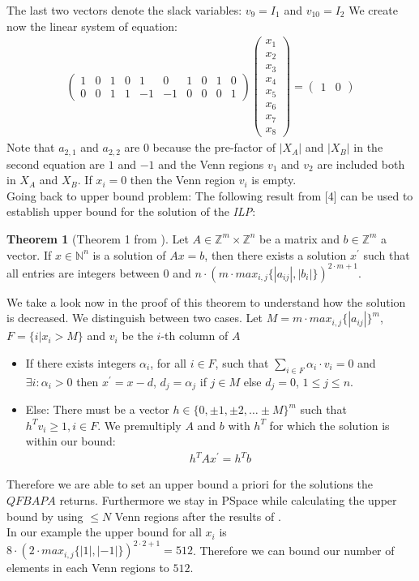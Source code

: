 \documentclass{book}
\theoremstyle{break}
\theoremstyle{definition}
\newtheorem{mythe}{Theorem}
\begin{document}
The last two vectors denote the slack variables: $v_9=I_1$ and $v_10=I_2$
We create now the linear system of equation:
\begin{align*}
\left ( \begin{array}{cccccccccc}
1&0&1&0&1&0&1&0&1&0\\
0&0&1&1&-1&-1&0&0&0&1
\end{array} \right )\left ( \begin{array}{c}
x_1\\x_2\\x_3\\x_4\\x_5\\x_6\\x_7\\x_8
\end{array}\right )=\left ( \begin{array}{cc}
1&0
\end{array}\right )
\end{align*}
Note that $a_{2,1}$ and $a_{2,2}$ are $0$ because the pre-factor of $|X_A|$ and $|X_B|$ in the second equation are $1$ and $-1$ and the Venn regions $v_1$ and $v_2$ are included both in $X_A$ and $X_B$. If $x_i=0$ then the Venn region $v_i$ is empty.\\
Going back to upper bound problem: The following result from [4] can be used to establish upper bound for the solution of the \textit{ILP}:
\begin{mythe}[Theorem 1 from \cite{knapsack}]\label{upper bound}
Let $A\in \mathbb{Z}^m\times \mathbb{Z}^n$ be a matrix and $b\in\mathbb{Z}^m$ a vector. If $x\in\mathbb{N}^n$ is a solution of $Ax=b$, then there exists a solution $x^\prime$ such that all entries are integers between $0$ and $n\cdot (m\cdot max_{i,j}\{|a_{ij}|,|b_i|\})^{2\cdot m+1}$.
\end{mythe}
We take a look now in the proof of this theorem to understand how the solution is decreased. We distinguish between two cases. Let $M=m\cdot max_{i,j}\{|a_{ij}|\}^m$, $F=\{i|x_i>M\}$ and $v_i$ be the $i$-th column of $A$
\begin{itemize}
\item If there exists integers $\alpha_i$, for all $i\in F$, such that $\sum_{i\in F}\alpha_i\cdot v_i=0$ and $\exists i: \alpha_i>0$ then $x^\prime=x-d$, $d_j=\alpha_j$ if $j\in M$ else $d_j=0$, $1\leq j\leq n$.
\item Else: There must be a vector $h\in\{0,\pm 1,\pm 2,\dots \pm M\}^m$ such that $h^T v_i\geq1, i\in F$. We premultiply $A$ and $b$ with $h^T$ for which the solution is within our bound:
\begin{align*}
h^TA x^\prime = h^Tb
\end{align*}
\end{itemize}
Therefore we are able to set an upper bound a priori for the solutions the $QFBAPA$ returns. Furthermore we stay in PSpace while calculating the upper bound by using $\leq N$ Venn regions after the results of \cite{4}.\\
In our example the upper bound for all $x_i$ is $8\cdot (2\cdot max_{i,j}\{|1|,|-1|\})^{2\cdot 2+1}=512$. Therefore we can bound our number of elements in each Venn regions to $512$. 
\end{document}
